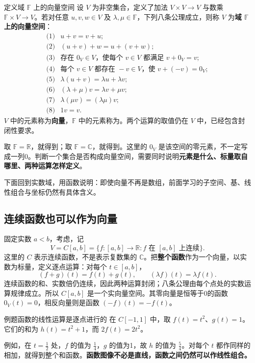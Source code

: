 \documentclass[a4paper,12pt,twoside,openany,fontset=none]{ctexbook}
\newcounter{definition}[chapter]
\newenvironment{definition}[1][]{\begin{defBox}{定义}{#1}}{\end{defBox}}
\newcounter{example}[chapter]
\newenvironment{example}[1][]{\begin{exBox}{例题}{#1}}{\end{exBox}}
\numberwithin{equation}{chapter}
\begin{document}
\begin{definition}[域 $\mathbb{F}$ 上的向量空间]
设 $V$ 为非空集合，定义了加法 $V\times V\to V$ 与数乘 $\mathbb{F}\times V\to V$。若对任意 $u,v,w\in V$ 及 $\lambda,\mu\in\mathbb{F}$，下列八条公理成立，则称 $V$ 为\textbf{域 $\mathbb{F}$ 上的向量空间}：
\[
\begin{array}{rl}
\text{(1)}&u+v=v+u;\\[3pt]
\text{(2)}&(u+v)+w=u+(v+w);\\[3pt]
\text{(3)}&\text{存在 }0_V\in V\text{，使每个 }v\in V\text{ 都满足 }v+0_V=v;\\[3pt]
\text{(4)}&\text{每个 }v\in V\text{ 都存在 }-v\in V\text{，使 }v+(-v)=0_V;\\[3pt]
\text{(5)}&\lambda(u+v)=\lambda u+\lambda v;\\[3pt]
\text{(6)}&(\lambda+\mu)v=\lambda v+\mu v;\\[3pt]
\text{(7)}&\lambda(\mu v)=(\lambda\mu)v;\\[3pt]
\text{(8)}&1v=v.
\end{array}
\]
$V$ 中的元素称为\textbf{向量}，$\mathbb{F}$ 中的元素称为\textbf{}。两个运算的取值仍在 $V$ 中，已经包含封闭性要求。
\end{definition}

取 $\mathbb{F}=\mathbb{R}$，就得到\textbf{}；取 $\mathbb{F}=\mathbb{C}$，就得到。这里的 $0_V$ 是该空间的零元素，不一定写成一列0。判断一个集合是否构成向量空间，需要同时说明\textbf{元素是什么、标量取自哪里、两种运算怎样定义}。

下面回到实数域，用函数说明：即使向量不再是数组，前面学习的子空间、基、线性组合与坐标仍然有具体含义。

\subsection*{连续函数也可以作为向量}

固定实数 $a<b$，考虑，记
\[
    V=C[a,b]=\{f:[a,b]\to\mathbb{R}:f\text{ 在 }[a,b]\text{ 上连续}\}.
\]
这里的 $C$ 表示连续函数，不是表示复数集的 $\mathbb{C}$。把\textbf{整个函数}作为一个向量，以实数为标量，定义逐点运算：对每个 $t\in[a,b]$，
\[
    (f+g)(t)=f(t)+g(t),\qquad (\lambda f)(t)=\lambda f(t).
\]
连续函数的和、实数倍仍连续，因此两种运算封闭；八条公理由每个点处的实数运算规律成立。所以 $C[a,b]$ 是一个实向量空间。其零向量是恒等于0的函数 $0_V(t)=0$，相反向量则是函数 $(-f)(t)=-f(t)$。

\begin{example}[函数的线性运算是逐点进行的]
在 $C[-1,1]$ 中，取 $f(t)=t^2$、$g(t)=1$。它们的和为 $h(t)=t^2+1$，而 $2f(t)=2t^2$。

例如，在 $t=\tfrac12$ 处，$f$ 的值为 $\tfrac14$，$g$ 的值为1，故 $h$ 的值为 $\tfrac54$。对每个 $t$ 都作同样的相加，就得到整个和函数。\textbf{函数图像不必是直线，函数之间仍然可以作线性组合。}
\end{example}
\end{document}
